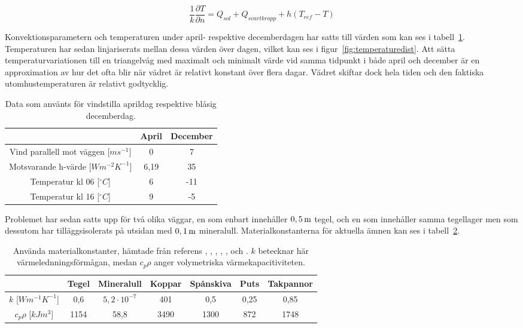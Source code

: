 \begin{equation}
\label{eq:wallneumann}
\frac{1}{k}\frac{\partial T}{\partial n} = Q_{sol} + Q_{svartkropp} + h(T_{ref}-T)
\end{equation}

Konvektionsparametern och temperaturen under april- respektive decemberdagen har satts till värden som kan ses i tabell~\ref{tbl:aprdec}. Temperaturen har sedan linjariserats mellan dessa värden över dagen, vilket kan ses i figur~\ref{fig:temperaturedist}. Att sätta temperaturvariationen till en triangelvåg med maximalt och minimalt värde vid samma tidpunkt i både april och december är en approximation av hur det ofta blir när vädret är relativt konstant över flera dagar. Vädret skiftar dock hela tiden och den faktiska utomhustemperaturen är relativt godtycklig.

\begin{table}[hpbt]
\centering
\caption{Data som använts för vindstilla aprildag respektive blåsig decemberdag.}
\begin{tabular}{c|c|c}
& April & December \\
\hline
Vind parallell mot väggen [$ms^{-1}$] & 0 & 7 \\
Motsvarande h-värde [$Wm^{-2}K^{-1}$] & 6,19 & 35 \\
Temperatur kl 06 [$^{\circ}C$] & 6 & -11 \\
Temperatur kl 16 [$^{\circ}C$] & 9 & -5
\end{tabular}
\label{tbl:aprdec}
\end{table}


Problemet har sedan satts upp för två olika väggar, en som enbart innehåller $\unit[0,5]{m}$ tegel, och en som innehåller samma tegellager men som dessutom har tilläggsisolerats på utsidan med $\unit[0,1]{m}$ mineralull. Materialkonstanterna för aktuella ämnen kan ses i tabell~\ref{tbl:materialconstants}.

\begin{table}[hpbt]
\centering
\caption{Använda materialkonstanter, hämtade från referens \cite{kandidatarbete2010}, \cite{engineeringtoolboxdensity}, \cite{bkvthermal}, \cite{engineeringtoolboxspecificheat}, \cite{engineeringcom}, \cite{engineeringtoolboxthermalconductivity} och \cite{ozel11}. $k$ betecknar här värmelednningsförmågan, medan $c_p\rho$ anger volymetriska värmekapacitiviteten.}
\begin{tabular}{c|c|c|c|c|c|c}
& Tegel & Mineralull & Koppar & Spånskiva & Puts & Takpannor \\
\hline
$k$ [$Wm^{-1}K^{-1}$] & 0,6 & $5,2\cdot 10^{-7}$ & 401 & 0,5 & 0,25 & 0,85\\
$c_p \rho$ [$kJm^{3}$] & 1154 & 58,8 & 3490 & 1300 & 872 & 1748
\end{tabular}
\label{tbl:materialconstants}
\end{table}

